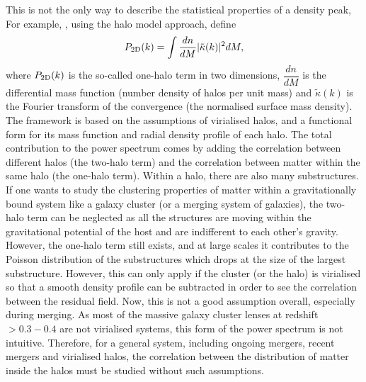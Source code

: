 \documentclass[
  11pt,
  twoside,
  openright,
  titlepage,
  headings=optiontoheadandtoc
]{scrbook}
\begin{document}
This is not the only way to describe the statistical properties of a density peak, For example,
\cite{2014arXiv1403.2720H}, using the halo model approach, define
\begin{equation}
    P_{\rm 2D}(k) = \int \dfrac{dn}{dM} |\tilde{\kappa}(k)|^2 dM,
\end{equation}
where $P_{\rm 2D}(k)$ is the so-called one-halo term in two dimensions,
$\dfrac{dn}{dM}$ is the differential mass function (number density of halos per unit mass) and
$\tilde{\kappa}(k)$ is the Fourier transform of the convergence (the normalised surface mass density).
The framework is based on the assumptions of virialised halos, and a functional
form for its mass function and radial density profile of each halo. The total contribution to the
power spectrum comes by adding the correlation between different halos (the two-halo term) and
the correlation between matter within the same halo (the one-halo term). Within a halo, there are also
many substructures. If one wants to study the clustering properties of matter within a gravitationally
bound system like a galaxy cluster (or a merging system of galaxies), the two-halo term can be
neglected as all the structures are moving within the gravitational potential of the host and are
indifferent to each other's gravity. However, the one-halo term still exists, and at large scales it
contributes to the Poisson distribution of the substructures which drops at the size of the largest
substructure.
However, this can only apply if the cluster (or the halo) is virialised so that a smooth density
profile can be subtracted in order to see the correlation between the residual field. Now, this is
not a good assumption overall, especially during merging. As most of the massive galaxy
cluster lenses at redshift $>0.3-0.4$ are not virialised systems, this form of the power spectrum
is not intuitive. Therefore, for a general system, including ongoing mergers, recent mergers
and virialised halos, the correlation between the distribution of matter inside the halos
must be studied without such assumptions.
\end{document}
